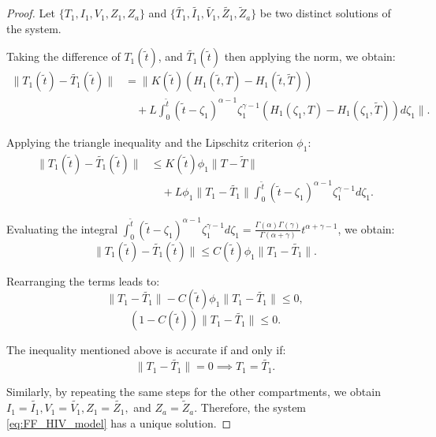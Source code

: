 \documentclass{article}
\theoremstyle{plain}
\theoremstyle{definition}
\numberwithin{equation}{section}
\begin{document}
\begin{proof}
 Let $\{T_1, I_1, V_1, Z_1, Z_a\}$ and $\{\tilde{T_1}, \tilde{I_1}, \tilde{V_1}, \tilde{Z_1}, \tilde{Z}_a\}$ be two distinct solutions of the system. 
	
	Taking the difference of $T_1(\tilde{t})$, and $\tilde{T_1}(\tilde{t})$ then applying the norm, we obtain:
	\begin{align*}
		\|T_1(\tilde{t}) - \tilde{T_1}(\tilde{t})\| &= \Bigg\| K(\tilde{t}) \left( H_1(\tilde{t}, T) - H_1(\tilde{t}, \tilde{T}) \right) \\
		&\quad + L \int_0^{\tilde{t}} (\tilde{t}-\zeta_1)^{\alpha-1} \zeta_1^{\gamma-1} \left( H_1(\zeta_1, T) - H_1(\zeta_1, \tilde{T}) \right) d\zeta_1 \Bigg\|.
	\end{align*}
	
	Applying the triangle inequality and the Lipschitz criterion $\phi_1$:
	\begin{align*}
		\|T_1(\tilde{t}) - \tilde{T_1}(\tilde{t})\| &\leq K(\tilde{t}) \phi_1 \|T - \tilde{T}\| \\
		&\quad + L \phi_1 \|T_1 - \tilde{T_1}\| \int_0^{\tilde{t}} (\tilde{t}-\zeta_1)^{\alpha-1} \zeta_1^{\gamma-1} d\zeta_1.
	\end{align*}
	
	Evaluating the integral $\int_0^{\tilde{t}} (\tilde{t}-\zeta_1)^{\alpha-1} \zeta_1^{\gamma-1} d\zeta_1 = \frac{\Gamma(\alpha)\Gamma(\gamma)}{\Gamma(\alpha+\gamma)} t^{\alpha+\gamma-1}$, we obtain:
	\begin{equation*}
		\|T_1(\tilde{t}) - \tilde{T_1}(\tilde{t})\| \leq C(\tilde{t}) \phi_1 \|T_1 - \tilde{T_1}\|.
	\end{equation*}
	
	Rearranging the terms leads to:
	\begin{equation*}
		\|T_1 - \tilde{T_1}\| - C(\tilde{t}) \phi_1 \|T_1 - \tilde{T_1}\| \leq 0,
	\end{equation*}
	\begin{equation}
		( 1 - C(\tilde{t}) )\|T_1 - \tilde{T_1}\| \leq 0.
	\end{equation}
	
	The inequality mentioned above is accurate if and only if:
	\begin{equation*}
		\|T_1 - \tilde{T_1}\| = 0 \implies T_1 = \tilde{T_1}.
	\end{equation*}
	
	Similarly, by repeating the same steps for the other compartments, we obtain $I_1 = \tilde{I_1},V_1 = \tilde{V_1},Z_1 = \tilde{Z_1},$ and $Z_a = \tilde{Z}_a.$
	Therefore, the system \eqref{eq:FF_HIV_model} has a unique solution.
\end{proof}
\end{document}
